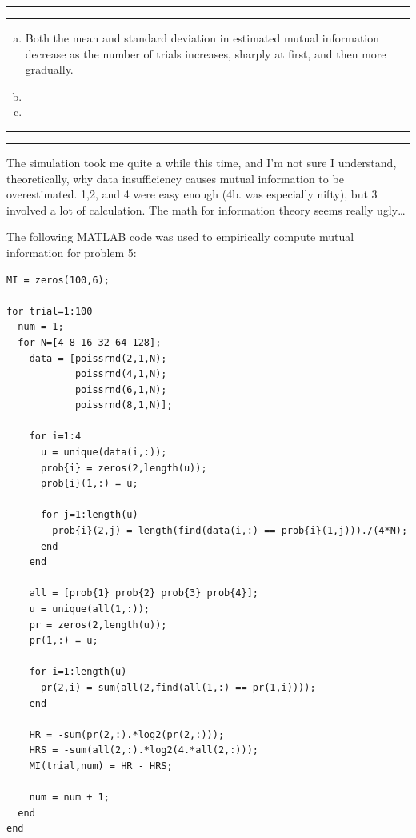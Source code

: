 \documentclass[11pt]{article}
\newcounter{questionCounter}
\newcounter{partCounter}[questionCounter]
\newenvironment{question}[2][\arabic{questionCounter}]{%
    \setcounter{partCounter}{0}%
    \vspace{.25in} \hrule \vspace{0.5em}%
        \noindent{\bf #2}%
    \vspace{0.8em} \hrule \vspace{.10in}%
    \addtocounter{questionCounter}{1}%
}{}
\begin{document}
\begin{question}{Problem 5}
\begin{enumerate}[a.]
\item Both the mean and standard deviation in estimated mutual information
decrease as the number of trials increases, sharply at first, and then more
gradually.

\item

\item

\end{enumerate}
\end{question}

\begin{question}{Problem 6}
The simulation took me quite a while this time, and I'm not sure I understand,
theoretically, why data insufficiency causes mutual information to be
overestimated. 1,2, and 4 were easy enough (4b. was especially nifty), but 3
involved a lot of calculation. The math for information theory seems really
ugly\dots
\end{question}

The following MATLAB code was used to empirically compute mutual information
for problem 5:

\begin{verbatim}
MI = zeros(100,6);

for trial=1:100
  num = 1;
  for N=[4 8 16 32 64 128];
    data = [poissrnd(2,1,N);
            poissrnd(4,1,N);
            poissrnd(6,1,N);
            poissrnd(8,1,N)];

    for i=1:4
      u = unique(data(i,:));
      prob{i} = zeros(2,length(u));
      prob{i}(1,:) = u;
  
      for j=1:length(u)
        prob{i}(2,j) = length(find(data(i,:) == prob{i}(1,j)))./(4*N);
      end
    end
  
    all = [prob{1} prob{2} prob{3} prob{4}];
    u = unique(all(1,:));
    pr = zeros(2,length(u));
    pr(1,:) = u;
  
    for i=1:length(u)
      pr(2,i) = sum(all(2,find(all(1,:) == pr(1,i))));
    end
  
    HR = -sum(pr(2,:).*log2(pr(2,:)));
    HRS = -sum(all(2,:).*log2(4.*all(2,:)));
    MI(trial,num) = HR - HRS;

    num = num + 1;
  end
end
\end{verbatim}
\end{document}
